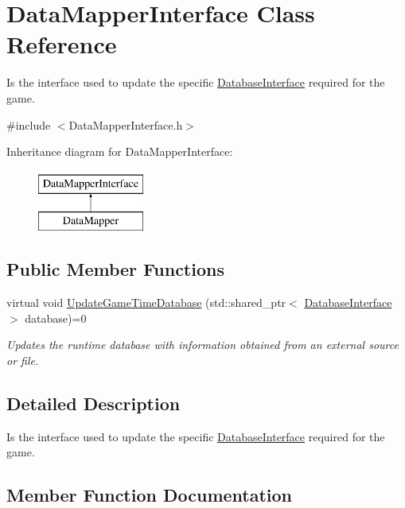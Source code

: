 \hypertarget{class_data_mapper_interface}{}\section{Data\+Mapper\+Interface Class Reference}
\label{class_data_mapper_interface}


Is the interface used to update the specific \hyperlink{class_database_interface}{Database\+Interface} required for the game.  




{\ttfamily \#include $<$Data\+Mapper\+Interface.\+h$>$}

Inheritance diagram for Data\+Mapper\+Interface\+:\begin{figure}[H]
\begin{center}
\leavevmode
\includegraphics[height=2.000000cm]{d1/d27/class_data_mapper_interface}
\end{center}
\end{figure}
\subsection*{Public Member Functions}
\begin{DoxyCompactItemize}
\item 
virtual void \hyperlink{class_data_mapper_interface_a4a16cab058079e14c1e6169d8038696f}{Update\+Game\+Time\+Database} (std\+::shared\+\_\+ptr$<$ \hyperlink{class_database_interface}{Database\+Interface} $>$ database)=0
\begin{DoxyCompactList}\small\item\em Updates the runtime database with information obtained from an external source or file. \end{DoxyCompactList}\end{DoxyCompactItemize}


\subsection{Detailed Description}
Is the interface used to update the specific \hyperlink{class_database_interface}{Database\+Interface} required for the game. 

\subsection{Member Function Documentation}
\mbox{\label{class_data_mapper_interface_a4a16cab058079e14c1e6169d8038696f}} 

